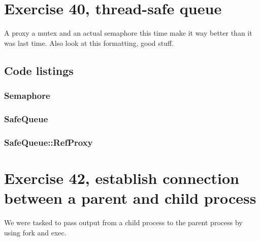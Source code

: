 \documentclass[11pt]{article}
\begin{document}
\section*{Exercise 40, thread-safe queue}
A proxy a mutex and an actual semaphore this time make it way better than it was last time.
Also look at this formatting, good stuff.

\subsection*{Code listings}



\subsubsection*{Semaphore}






\subsubsection*{SafeQueue}






\subsubsection*{SafeQueue::RefProxy}





\section*{Exercise 42, establish connection between a parent and child process}
We were tasked to pass output from a child process to the parent process by using fork and exec.
\end{document}
